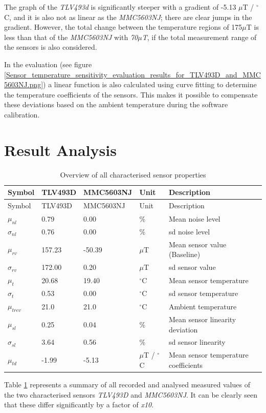 The graph of the \emph{TLV493d} is significantly steeper with a gradient
of -5.13 \(\mu\)T / \(^{\circ}\)C, and it is also not as linear as the
\emph{MMC5603NJ}; there are clear jumps in the gradient. However, the
total change between the temperature regions of 175\(\mu\)T is less than
that of the \emph{MMC5603NJ} with \emph{70\(\mu\)T}, if the total
measurement range of the sensors is also considered.

In the evaluation (see figure
\ref{Sensor_temperature_sensitivity_evaluation_results_for_TLV493D_and_MMC5603NJ.png})
a linear function is also calculated using curve fitting to determine
the temperature coefficients of the sensors. This makes it possible to
compensate these deviations based on the ambient temperature during the
software calibration.

\hypertarget{result-analysis-1}{%
\section{Result Analysis}\label{result-analysis-1}}

\begin{longtable}[]{@{}lllll@{}}
\caption{Overview of all characterised sensor properties
\label{Overview_of_all_characterised_sensor_properties.csv}}\tabularnewline
\toprule
Symbol & TLV493D & MMC5603NJ & Unit & Description\tabularnewline
\midrule
\endfirsthead
\toprule
Symbol & TLV493D & MMC5603NJ & Unit & Description\tabularnewline
\midrule
\endhead
\(\mu_{nl}\) & 0.79 & 0.00 & \% & Mean noise level\tabularnewline
\(\sigma_{nl}\) & 0.76 & 0.00 & \% & \gls{sd} noise level\tabularnewline
\(\mu_{rv}\) & 157.23 & -50.39 & \(\mu\)T & Mean sensor value
(Baseline)\tabularnewline
\(\sigma_{rv}\) & 172.00 & 0.20 & \(\mu\)T & \gls{sd} sensor
value\tabularnewline
\(\mu_{t}\) & 20.68 & 19.40 & \(^{\circ}\)C & Mean sensor
temperature\tabularnewline
\(\sigma_{t}\) & 0.53 & 0.00 & \(^{\circ}\)C & \gls{sd} sensor
temperature\tabularnewline
\(\mu_{trev}\) & 21.0 & 21.0 & \(^{\circ}\)C & Ambient
temperature\tabularnewline
\(\mu_{sl}\) & 0.25 & 0.04 & \% & Mean sensor linearity
deviation\tabularnewline
\(\sigma_{sl}\) & 3.64 & 0.56 & \% & \gls{sd} sensor
linearity\tabularnewline
\(\mu_{td}\) & -1.99 & -5.13 & \(\mu\)T / \(^{\circ}\)C & Mean sensor
temperature coefficients\tabularnewline
\bottomrule
\end{longtable}

Table \ref{Overview_of_all_characterised_sensor_properties.csv}
represents a summary of all recorded and analysed measured values of the
two characterised sensors \emph{TLV493D} and \emph{MMC5603NJ}. It can be
clearly seen that these differ significantly by a factor of \emph{x10}.

